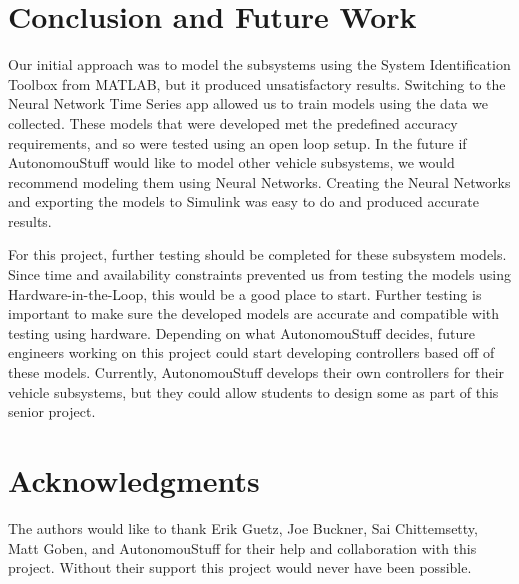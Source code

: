 \documentclass[journal,twoside,web]{ieeecolor}
\begin{document}
\section{Conclusion and Future Work}
\label{sec:conclustionAndFutureWork}
Our initial approach was to model the subsystems using the System Identification Toolbox from MATLAB, but it produced unsatisfactory results. Switching to the Neural Network Time Series app allowed us to train models using the data we collected. These models that were developed met the predefined accuracy requirements, and so were tested using an open loop setup. In the future if AutonomouStuff would like to model other vehicle subsystems, we would recommend modeling them using Neural Networks. Creating the Neural Networks and exporting the models to Simulink was easy to do and produced accurate results. 

For this project, further testing should be completed for these subsystem models. Since time and availability constraints prevented us from testing the models using Hardware-in-the-Loop, this would be a good place to start. Further testing is important to make sure the developed models are accurate and compatible with testing using hardware. Depending on what AutonomouStuff decides, future engineers working on this project could start developing controllers based off of these models. Currently, AutonomouStuff develops their own controllers for their vehicle subsystems, but they could allow students to design some as part of this senior project. 

\section*{Acknowledgments}
The authors would like to thank Erik Guetz, Joe Buckner, Sai Chittemsetty, Matt Goben, and AutonomouStuff for their help and collaboration with this project. Without their support this project would never have been possible. 






%
\end{document}
